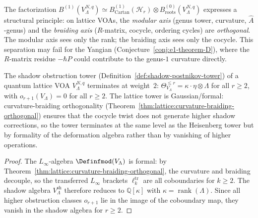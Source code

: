\begin{remark}\label{rem:lattice:orthogonality-principle}
The factorization
$B^{(1)}(V_\Lambda^{N,q}) \simeq
B^{(1)}_{\mathrm{Cartan}}(\mathcal{H}_r) \otimes
B^{(0)}_{\mathrm{roots}}(V_\Lambda^{N,q})$
expresses a structural principle: on lattice VOAs, the \emph{modular axis}
(genus tower, curvature, $\hat{A}$-genus) and the \emph{braiding axis}
($R$-matrix, cocycle, ordering cycles) are \emph{orthogonal}. The modular
axis sees only the rank; the braiding axis sees only the cocycle. This
separation may fail for the Yangian
(Conjecture~\ref{conj:e1-theorem-D}), where the $R$-matrix residue
$-\hbar P$ could contribute to the genus-$1$ curvature directly.
\end{remark}

\begin{corollary}
\label{cor:lattice-postnikov-termination}
The shadow obstruction tower
\textup{(}Definition~\textup{\ref{def:shadow-postnikov-tower})}
of a quantum lattice VOA $V_\Lambda^{N,q}$ terminates at
weight~$2$:
$\Theta_{V_\Lambda}^{\leq r} = \kappa \cdot \eta \otimes \Lambda$
for all $r \geq 2$, with $o_{r+1}(V_\Lambda) = 0$ for all $r \geq 2$.
The lattice tower is Gaussian/formal:
curvature-braiding orthogonality
\textup{(}Theorem~\textup{\ref{thm:lattice:curvature-braiding-orthogonal})}
ensures that the cocycle twist does not generate higher shadow
corrections, so the tower terminates at the same level as the
Heisenberg tower but by formality of the deformation algebra rather
than by vanishing of higher operations.
\end{corollary}

\begin{proof}
The $L_\infty$-algebra $\Definfmod(V_\Lambda)$ is formal:
by Theorem~\ref{thm:lattice:curvature-braiding-orthogonal}, the
curvature and braiding decouple, so the transferred $L_\infty$ brackets
$\ell_k^{\mathrm{tr}}$ are all coboundaries for $k \geq 2$.
The shadow algebra $V_\Lambda^{\mathrm{sh}}$ therefore reduces to
$\mathbb{Q}[\kappa]$ with $\kappa = \operatorname{rank}(\Lambda)$.
Since all higher obstruction classes $o_{r+1}$ lie in the image of the
coboundary map, they vanish in the shadow algebra for $r \geq 2$.
\end{proof}

